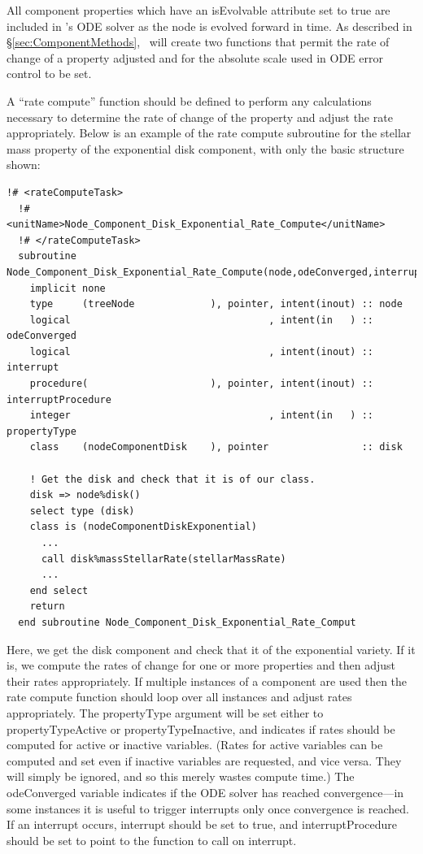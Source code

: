 All component properties which have an {\normalfont \ttfamily isEvolvable} attribute set to {\normalfont \ttfamily true} are included in \glc's ODE solver as the node is evolved forward in time. As described in \S\ref{sec:ComponentMethods}, \glc\ will create two functions that permit the rate of change of a property adjusted and for the absolute scale used in ODE error control to be set.

A ``rate compute'' function should be defined to perform any calculations necessary to determine the rate of change of the property and adjust the rate appropriately. Below is an example of the rate compute subroutine for the stellar mass property of the exponential disk component, with only the basic structure shown:
\begin{lstlisting}[escapechar=@,breaklines,prebreak=\&,postbreak=\&]
  !# <rateComputeTask>
  !#  <unitName>Node_Component_Disk_Exponential_Rate_Compute</unitName>
  !# </rateComputeTask>
  subroutine Node_Component_Disk_Exponential_Rate_Compute(node,odeConverged,interrupt,interruptProcedure,propertyType)
    implicit none
    type     (treeNode             ), pointer, intent(inout) :: node
    logical                                  , intent(in   ) :: odeConverged
    logical                                  , intent(inout) :: interrupt
    procedure(                     ), pointer, intent(inout) :: interruptProcedure
    integer                                  , intent(in   ) :: propertyType
    class    (nodeComponentDisk    ), pointer                :: disk
 
    ! Get the disk and check that it is of our class.
    disk => node%disk()
    select type (disk)
    class is (nodeComponentDiskExponential)
      ...
      call disk%massStellarRate(stellarMassRate)
      ...
    end select
    return
  end subroutine Node_Component_Disk_Exponential_Rate_Comput
\end{lstlisting}
Here, we get the disk component and check that it of the {\normalfont \ttfamily exponential} variety. If it is, we compute the rates of change for one or more properties and then adjust their rates appropriately. If multiple instances of a component are used then the rate compute function should loop over all instances and adjust rates appropriately. The {\normalfont \ttfamily propertyType} argument will be set either to {\normalfont \ttfamily propertyTypeActive} or {\normalfont \ttfamily propertyTypeInactive}, and indicates if rates should be computed for active or inactive variables. (Rates for active variables can be computed and set even if inactive variables are requested, and vice versa. They will simply be ignored, and so this merely wastes compute time.) The {\normalfont \ttfamily odeConverged} variable indicates if the ODE solver has reached convergence---in some instances it is useful to trigger interrupts only once convergence is reached. If an interrupt occurs, {\normalfont \ttfamily interrupt} should be set to {\normalfont \ttfamily true}, and {\normalfont \ttfamily interruptProcedure} should be set to point to the function to call on interrupt.

